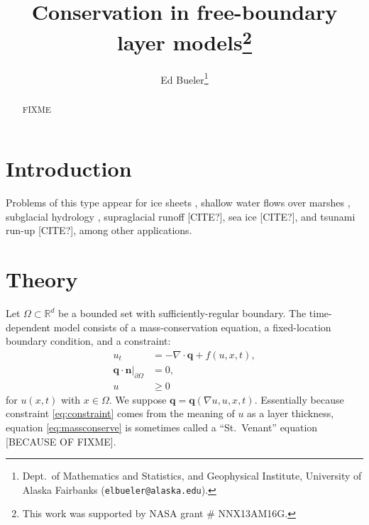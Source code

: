 \documentclass[final,leqno,onefignum,onetabnum]{siamltex1213bueler}
\title{Conservation in free-boundary layer models\thanks{This work was supported by NASA grant \# NNX13AM16G.}}
\author{Ed Bueler\thanks{Dept.~of Mathematics and Statistics, and Geophysical Institute, University of Alaska Fairbanks (\texttt{elbueler@alaska.edu}).}}
\newcommand\bn{\mathbf{n}}
\newcommand\bq{\mathbf{q}}
\newcommand{\Div}{\nabla\cdot}
\renewcommand{\grad}{\nabla}
\newcommand\RR{\mathbb{R}}
\begin{document}
\maketitle
{}%

\begin{abstract}
FIXME
\end{abstract}




\pagestyle{myheadings}
\thispagestyle{plain}

\section{Introduction}

Problems of this type appear for ice sheets \cite{JouvetBueler2012}, shallow water flows over marshes \cite{AlonsoSantillanaDawson}, subglacial hydrology \cite{AschwandenBuelerKhroulevBlatter,BuelervanPeltDRAFT,Schoofetal2012}, supraglacial runoff [CITE?], sea ice [CITE?], and tsunami run-up [CITE?], among other applications.

\section{Theory}

Let $\Omega \subset \RR^d$ be a bounded set with sufficiently-regular boundary.  The time-dependent model consists of a mass-conservation equation, a fixed-location boundary condition, and a constraint:
\begin{align}
u_t &= - \Div \bq + f(u,x,t), \label{eq:massconserve} \\
\bq \cdot \bn \Big|_{\partial\Omega} &= 0, \label{eq:fixedneumann} \\
u &\ge 0 \label{eq:constraint}
\end{align}
for $u(x,t)$ with $x\in \Omega$.  We suppose $\bq = \bq(\grad u, u, x, t)$.  Essentially because constraint \eqref{eq:constraint} comes from the meaning of $u$ as a layer thickness, equation \eqref{eq:massconserve} is sometimes called a ``St.~Venant'' equation [BECAUSE OF FIXME].
\end{document}
